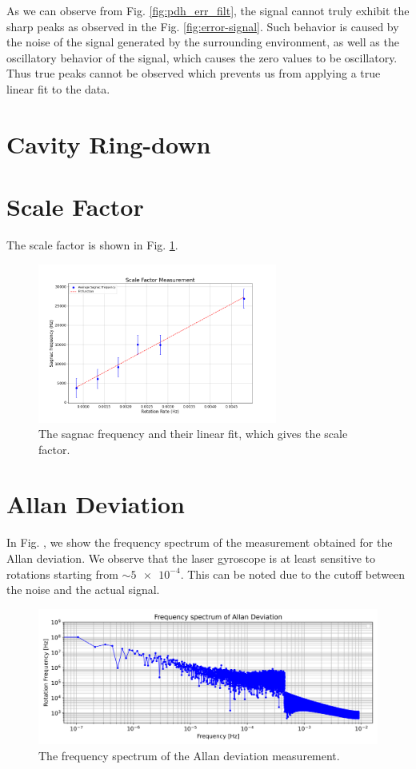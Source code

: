 \documentclass[a4paper]{report}
\numberwithin{equation}{section}
\begin{document}
As we can observe from Fig. \ref{fig:pdh_err_filt}, the signal cannot truly exhibit the sharp peaks as observed in the 
Fig. \ref{fig:error-signal}. Such behavior is caused by the noise of the signal generated by the surrounding environment, as well as the
 oscillatory behavior of the signal, which causes the zero values to be oscillatory. Thus true peaks cannot be observed which 
 prevents us from applying a true linear fit to the data. \par 

\section{Cavity Ring-down}

\section{Scale Factor}
The scale factor is shown in Fig. \ref{fig:scale-factor}. 

\begin{figure}[htpb]
	\centering
	\includegraphics[width=0.7\textwidth]{scale-factor}
	\caption{The sagnac frequency and their linear fit, which gives the scale factor.}
	\label{fig:scale-factor}
\end{figure}


\section{Allan Deviation}

In Fig. , we show the frequency spectrum of the measurement obtained for the Allan deviation. We observe that the laser gyroscope is 
at least sensitive to rotations starting from $\sim \num{5e-4}$. This can be noted due to the cutoff between the noise and the 
actual signal. 

\begin{figure}[h!]
	\centering
	\includegraphics[width=0.8\columnwidth]{allan_fs.png}
	\caption{The frequency spectrum of the Allan deviation measurement.}
	\label{fig:allan}
\end{figure}
\end{document}
